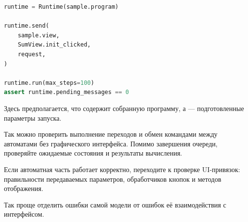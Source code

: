 \begin{lstlisting}[language=Python,numbers=none]
runtime = Runtime(sample.program)

runtime.send(
    sample.view,
    SumView.init_clicked,
    request,
)

runtime.run(max_steps=100)
assert runtime.pending_messages == 0
\end{lstlisting}

Здесь предполагается, что  содержит
собранную программу, а  --- подготовленные
параметры запуска.

Так можно проверить выполнение переходов и обмен
командами между автоматами без графического интерфейса.
Помимо завершения очереди, проверяйте ожидаемые
состояния и результаты вычисления.

Если автоматная часть работает корректно, переходите
к проверке UI-привязок: правильности передаваемых
параметров, обработчиков кнопок и методов отображения.

Так проще отделить ошибки самой модели от ошибок
её взаимодействия с интерфейсом.
